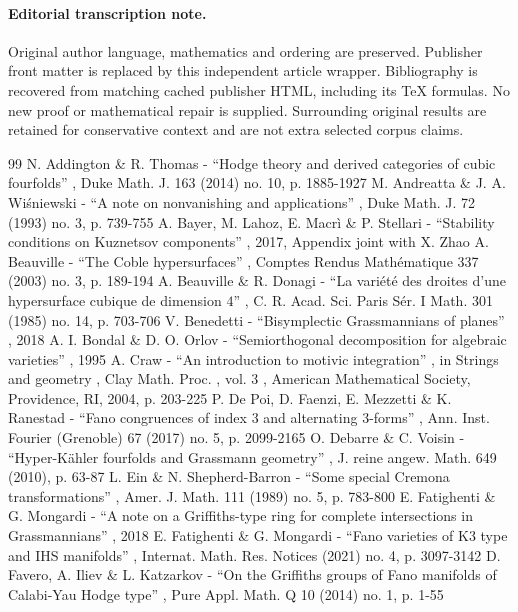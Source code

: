 \documentclass[11pt]{article}
\begin{document}
\paragraph{Editorial transcription note.}
Original author language, mathematics and ordering are preserved. Publisher front matter is replaced by this independent article wrapper. Bibliography is recovered from matching cached publisher HTML, including its TeX formulas. No new proof or mathematical repair is supplied. Surrounding original results are retained for conservative context and are not extra selected corpus claims.
\clearpage

\begin{thebibliography}{99}
 N. Addington \& R. Thomas - “Hodge theory and derived categories of cubic fourfolds” , Duke Math. J. 163 (2014) no. 10, p. 1885-1927
 M. Andreatta \& J. A. Wiśniewski - “A note on nonvanishing and applications” , Duke Math. J. 72 (1993) no. 3, p. 739-755
 A. Bayer, M. Lahoz, E. Macrì \& P. Stellari - “Stability conditions on Kuznetsov components” , 2017, Appendix joint with X. Zhao
 A. Beauville - “The Coble hypersurfaces” , Comptes Rendus Mathématique 337 (2003) no. 3, p. 189-194
 A. Beauville \& R. Donagi - “La variété des droites d’une hypersurface cubique de dimension $4$” , C. R. Acad. Sci. Paris Sér. I Math. 301 (1985) no. 14, p. 703-706
 V. Benedetti - “Bisymplectic Grassmannians of planes” , 2018
 A. I. Bondal \& D. O. Orlov - “Semiorthogonal decomposition for algebraic varieties” , 1995
 A. Craw - “An introduction to motivic integration” , in Strings and geometry , Clay Math. Proc. , vol. 3 , American Mathematical Society, Providence, RI, 2004, p. 203-225
 P. De Poi, D. Faenzi, E. Mezzetti \& K. Ranestad - “Fano congruences of index 3 and alternating 3-forms” , Ann. Inst. Fourier (Grenoble) 67 (2017) no. 5, p. 2099-2165
 O. Debarre \& C. Voisin - “Hyper-Kähler fourfolds and Grassmann geometry” , J. reine angew. Math. 649 (2010), p. 63-87
 L. Ein \& N. Shepherd-Barron - “Some special Cremona transformations” , Amer. J. Math. 111 (1989) no. 5, p. 783-800
 E. Fatighenti \& G. Mongardi - “A note on a Griffiths-type ring for complete intersections in Grassmannians” , 2018
 E. Fatighenti \& G. Mongardi - “Fano varieties of K3 type and IHS manifolds” , Internat. Math. Res. Notices (2021) no. 4, p. 3097-3142
 D. Favero, A. Iliev \& L. Katzarkov - “On the Griffiths groups of Fano manifolds of Calabi-Yau Hodge type” , Pure Appl. Math. Q 10 (2014) no. 1, p. 1-55

\end{thebibliography}
\end{document}
